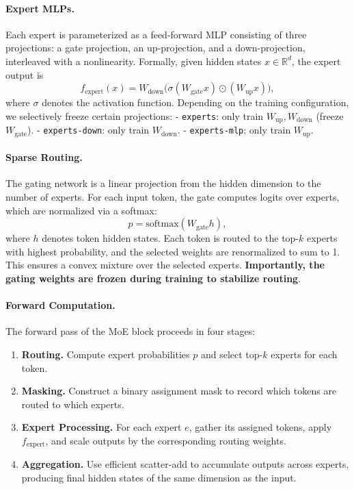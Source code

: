 \documentclass{article} %
\begin{document}
\paragraph{Expert MLPs.}  
Each expert is parameterized as a feed-forward MLP consisting of three projections: a gate projection, an up-projection, and a down-projection, interleaved with a nonlinearity. Formally, given hidden states $x \in \mathbb{R}^{d}$, the expert output is
\[
f_{\text{expert}}(x) = W_{\text{down}} \big( \sigma(W_{\text{gate}} x) \odot (W_{\text{up}} x) \big),
\]
where $\sigma$ denotes the activation function. Depending on the training configuration, we selectively freeze certain projections:  
- \texttt{experts}: only train $W_\text{up}, W_\text{down}$ (freeze $W_\text{gate}$).  
- \texttt{experts-down}: only train $W_\text{down}$.  
- \texttt{experts-mlp}: only train $W_\text{up}$.  

\paragraph{Sparse Routing.}  
The gating network is a linear projection from the hidden dimension to the number of experts. For each input token, the gate computes logits over experts, which are normalized via a softmax:
\[
p = \text{softmax}(W_\text{gate} h),
\]
where $h$ denotes token hidden states. Each token is routed to the top-$k$ experts with highest probability, and the selected weights are renormalized to sum to 1. This ensures a convex mixture over the selected experts. \textbf{Importantly, the gating weights are frozen during training to stabilize routing}.  

\paragraph{Forward Computation.}  
The forward pass of the MoE block proceeds in four stages:  

\begin{enumerate}
    \item \textbf{Routing.} Compute expert probabilities $p$ and select top-$k$ experts for each token.  
    \item \textbf{Masking.} Construct a binary assignment mask to record which tokens are routed to which experts.  
    \item \textbf{Expert Processing.} For each expert $e$, gather its assigned tokens, apply $f_\text{expert}$, and scale outputs by the corresponding routing weights.  
    \item \textbf{Aggregation.} Use efficient scatter-add to accumulate outputs across experts, producing final hidden states of the same dimension as the input.  
\end{enumerate}
\end{document}
